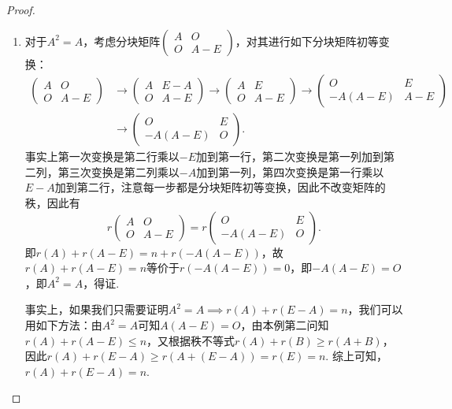 \begin{proof}
\begin{enumerate}
        \item 对于$A^2=A$，考虑分块矩阵$\begin{pmatrix}
                      A & O \\ O & A-E
                  \end{pmatrix}$，对其进行如下分块矩阵初等变换：
              \begin{align*}
                  \begin{pmatrix}
                      A & O \\ O & A-E
                  \end{pmatrix} & \to\begin{pmatrix}
                                         A & E-A \\ O & A-E
                                     \end{pmatrix}
                  \to\begin{pmatrix}
                         A & E \\ O & A-E
                     \end{pmatrix}
                  \to\begin{pmatrix}
                         O & E \\ -A(A-E) & A-E
                     \end{pmatrix}                  \\
                                   & \to\begin{pmatrix}
                                            O & E \\ -A(A-E) & O
                                        \end{pmatrix}.
              \end{align*}
              事实上第一次变换是第二行乘以$-E$加到第一行，第二次变换是第一列加到第二列，第三次变换是第二列乘以$-A$加到第一列，第四次变换是第一行乘以$E-A$加到第二行，注意每一步都是分块矩阵初等变换，因此不改变矩阵的秩，因此有
              \[r\begin{pmatrix}
                      A & O \\ O & A-E
                  \end{pmatrix}=r\begin{pmatrix}
                      O & E \\ -A(A-E) & O
                  \end{pmatrix}.\]
              即$r(A)+r(A-E)=n+r(-A(A-E))$，故$r(A)+r(A-E)=n$等价于$r(-A(A-E))=0$，即$-A(A-E)=O$，即$A^2=A$，得证.

              事实上，如果我们只需要证明$A^2=A \implies r(A)+r(E-A)=n$，我们可以用如下方法：由$A^2=A$可知$A(A-E)=O$，由本例第二问知$r(A)+r(A-E)\leqslant n$，又根据秩不等式$r(A)+r(B)\geqslant r(A+B)$，因此$r(A)+r(E-A)\geqslant r(A+(E-A))=r(E)=n$. 综上可知，$r(A)+r(E-A)=n$.
    \end{enumerate}
\end{proof}

